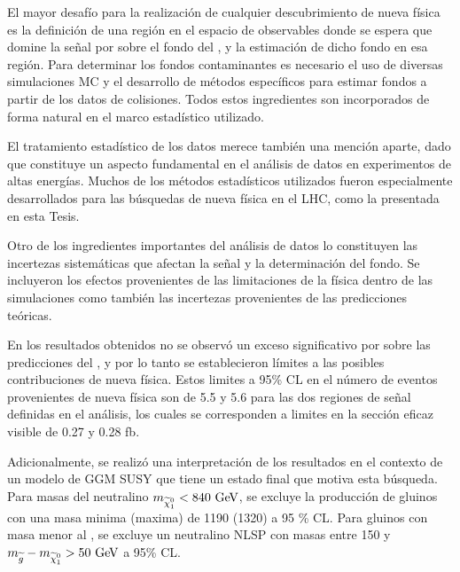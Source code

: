 
El mayor desafío para la realización de cualquier descubrimiento de nueva física
es la definición de una región en el espacio de observables donde se espera que
domine la señal por sobre el fondo del {\SM}, y la estimación de dicho fondo en
esa región. Para determinar los fondos contaminantes es necesario el uso de diversas
simulaciones MC y el desarrollo de métodos específicos para estimar fondos a partir de los
datos de colisiones.
Todos estos ingredientes son incorporados de forma natural en el marco estadístico
utilizado.

El tratamiento estadístico de los datos merece también una mención aparte, dado que
constituye un aspecto fundamental en el
análisis de datos en experimentos de altas energías. Muchos de
los métodos estadísticos utilizados fueron especialmente desarrollados para las
búsquedas de nueva física en el LHC, como la presentada en esta Tesis.

Otro de los ingredientes importantes del análisis de datos lo constituyen las
incertezas sistemáticas que afectan la señal y la determinación del fondo. Se
incluyeron los efectos provenientes de las limitaciones de la física dentro de
las simulaciones como también las incertezas provenientes de las predicciones
teóricas.

En los resultados obtenidos no se observó un exceso significativo por sobre las predicciones del {\SM}, y por lo tanto se
establecieron límites a las posibles contribuciones de nueva física.
Estos limites a 95\% CL en el número de eventos provenientes de nueva física
son de 5.5 y 5.6 para las dos regiones de señal definidas en el análisis, los
cuales se corresponden a limites en la sección eficaz visible de 0.27 y 0.28 fb.


Adicionalmente, se realizó una interpretación de los resultados en el contexto
de un modelo de GGM SUSY que tiene un estado final que motiva esta búsqueda.
Para masas del neutralino $m_{\ninoone}< 840 \gev$, se excluye la producción de gluinos
con una masa minima (maxima) de  1190 (1320) \gev a 95 \% CL.
Para gluinos con masa menor al \tev, se excluye un neutralino NLSP con masas entre
150 {\gev} y $m_{\gluino}-m_{\ninoone} > 50 \gev$ a 95\% CL.

